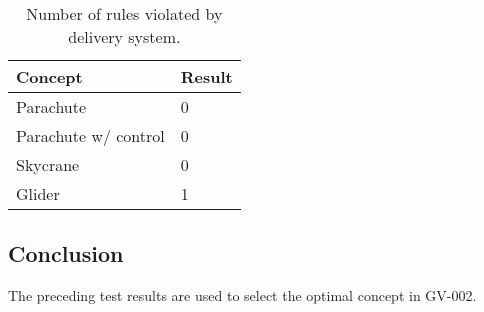 \documentclass[]{auvsi_doc}
\begin{document}
	\begin{table}[!h]
	\centering

	\caption{Number of rules violated by delivery system.}
	\label{rules}
	\begin{tabular}{|l|l|}
		\hline
		\rowcolor[HTML]{C0C0C0}
		\textbf{Concept}       & \textbf{Result} \\
		\hline
		Parachute              &       0          \\
		Parachute w/ control   &       0         \\
		Skycrane               &            0     \\
		Glider                 &		1		 \\
		\hline
	\end{tabular}
	\end{table}

\subsection{Conclusion}
The preceding test results are used to select the optimal concept in GV-002.
\end{document}

